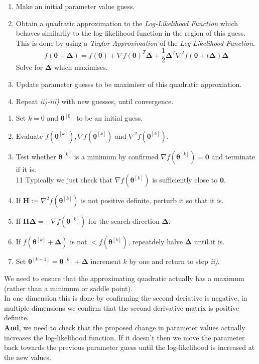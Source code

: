 \documentclass[11pt,a4paper]{article}
\begin{document}
\begin{enumerate}
	\item Make an initial parameter value guess.
	\item Obtain a quadratic approximation to the \textit{Log-Likelihood Function} which behaves similarlly to the log-likelihood function in the region of this guess.\\
	\nb This is done by using a \textit{Taylor Approximation} of the \textit{Log-Likelihood Function}.
	$$f(\pmb\theta+\pmb\Delta)=f(\pmb\theta)+\nabla f(\pmb\theta)^T\pmb\Delta+\frac12\pmb\Delta^T\nabla^2f(\pmb\theta+t\pmb\Delta)\pmb\Delta$$
	Solve for $\pmb\Delta$ which maximises.
	\item Update parameter guesss to be maximiser of this quadratic approxiation.
	\item Repeat \textit{ii)-iii)} with new guesses, until convergence.
\end{enumerate}

\begin{enumerate}
	\item Set $k=0$ and $\pmb\theta^{[0]}$ to be an initial guess.
	\item Evaluate $f(\pmb\theta^{[k]}),\nabla f(\pmb\theta^{[k]})$ and $\nabla^2 f(\pmb\theta^{[k]})$.
	\item Test whether $\pmb\theta^{[k]}$ is a minimum by confirmed $\nabla f(\pmb\theta^{[k]})=\textbf{0}$ and terminate if it is.\\
11	\nb Typically we just check that $\nabla f(\pmb\theta^{[k]})$ is sufficiently close to $\textbf{0}$.
	\item If $\textbf{H}:=\nabla^2 f(\pmb\theta^{[k]})$ is not positive definite, perturb it so that it is.
	\item If $\textbf{H}\pmb\Delta=-\nabla f(\pmb\theta^{[k]})$ for the search direction $\pmb\Delta$.
	\item If $f(\pmb\theta^{[k]}+\pmb\Delta)$ is not $<f(\pmb\theta^{[k]})$, repeatdely halve $\pmb\Delta$ until it is.
	\item Set $\pmb\theta^{[k+1]}=\pmb\theta^{[k]}+\pmb\Delta$ increment $k$ by one and return to step \textit{ii)}.
\end{enumerate}

We need to ensure that the approximating quadratic actually has a maximum (rather than a minimum or saddle point).\\
In one dimension this is done by confirming the second deriative is negative, in multiple dimensions we confirm that the second derivative matrix is positive definite.\\
\textbf{And}, we need to check that the proposed change in parameter values actually increases the log-likelihood function. If it doesn't then we move the parameter back towards the previous parameter guess until the log-likelihood is increased at the new values.\\
\end{document}
